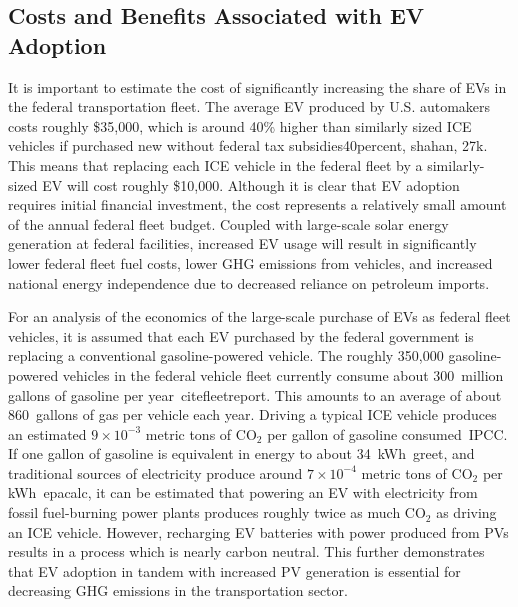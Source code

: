\subsection{Costs and Benefits Associated with EV Adoption}

It is important to estimate the cost of significantly increasing the share of EVs in the federal transportation fleet. The average EV produced by U.S. automakers costs roughly \$35,000, which is around 40\% higher than similarly sized ICE vehicles if purchased new without federal tax subsidies\cite{eric}{40percent, shahan, 27k}. This means that replacing each ICE vehicle in the federal fleet by a similarly-sized EV will cost roughly \$10,000. Although it is clear that EV adoption requires initial financial investment, the cost represents a relatively small amount of the annual federal fleet budget. Coupled with large-scale solar energy generation at federal facilities, increased EV usage will result in significantly lower federal fleet fuel costs, lower GHG emissions from vehicles, and increased national energy independence due to decreased reliance on petroleum imports.


For an analysis of the economics of the large-scale purchase of EVs as federal fleet vehicles, it is assumed that each EV purchased by the federal government is replacing a conventional gasoline-powered vehicle. The roughly 350,000 gasoline-powered vehicles in the federal vehicle fleet currently consume about 300~million gallons of gasoline per year~cite{fleetreport}. This amounts to an average of about 860~gallons of gas per vehicle each year. Driving a typical ICE vehicle produces an estimated $9 \times 10^{-3}$ metric tons of CO$_2$ per gallon of gasoline consumed~\cite{eric}{IPCC}. If one gallon of gasoline is equivalent in energy to about 34~kWh~\cite{eric}{greet}, and traditional sources of electricity produce around $7\times10^{-4}$ metric tons of CO$_2$ per kWh~\cite{eric}{epacalc}, it can be estimated that powering an EV with electricity from fossil fuel-burning power plants produces roughly twice as much CO$_2$ as driving an ICE vehicle. However, recharging EV batteries with power produced from PVs results in a process which is nearly carbon neutral. This further demonstrates that EV adoption in tandem with increased PV generation is essential for decreasing GHG emissions in the transportation sector.

